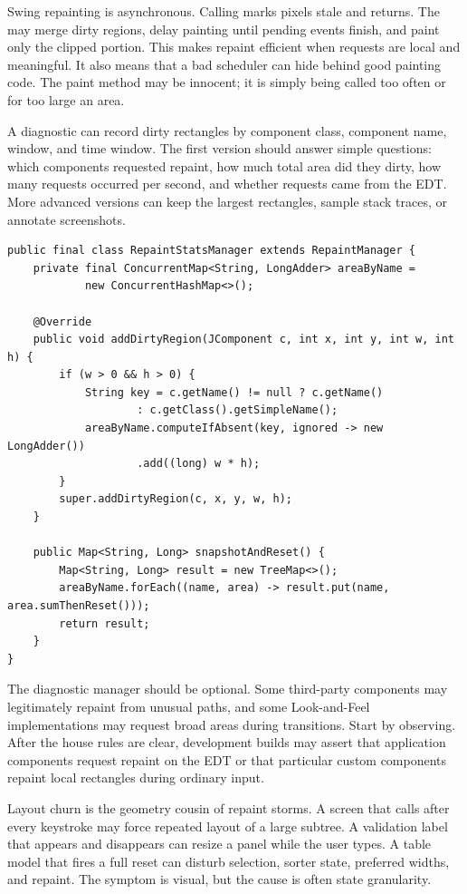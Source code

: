 Swing repainting is asynchronous. Calling  marks pixels stale and returns. The  may merge dirty regions, delay painting until pending events finish, and paint only the clipped portion. This makes repaint efficient when requests are local and meaningful. It also means that a bad scheduler can hide behind good painting code. The paint method may be innocent; it is simply being called too often or for too large an area.

A diagnostic  can record dirty rectangles by component class, component name, window, and time window. The first version should answer simple questions: which components requested repaint, how much total area did they dirty, how many requests occurred per second, and whether requests came from the EDT. More advanced versions can keep the largest rectangles, sample stack traces, or annotate screenshots.

\begin{lstlisting}[caption={Counting dirty repaint area by component name.}]
public final class RepaintStatsManager extends RepaintManager {
    private final ConcurrentMap<String, LongAdder> areaByName =
            new ConcurrentHashMap<>();

    @Override
    public void addDirtyRegion(JComponent c, int x, int y, int w, int h) {
        if (w > 0 && h > 0) {
            String key = c.getName() != null ? c.getName()
                    : c.getClass().getSimpleName();
            areaByName.computeIfAbsent(key, ignored -> new LongAdder())
                    .add((long) w * h);
        }
        super.addDirtyRegion(c, x, y, w, h);
    }

    public Map<String, Long> snapshotAndReset() {
        Map<String, Long> result = new TreeMap<>();
        areaByName.forEach((name, area) -> result.put(name, area.sumThenReset()));
        return result;
    }
}
\end{lstlisting}

The diagnostic manager should be optional. Some third-party components may legitimately repaint from unusual paths, and some Look-and-Feel implementations may request broad areas during transitions. Start by observing. After the house rules are clear, development builds may assert that application components request repaint on the EDT or that particular custom components repaint local rectangles during ordinary input.

Layout churn is the geometry cousin of repaint storms. A screen that calls  after every keystroke may force repeated layout of a large subtree. A validation label that appears and disappears can resize a panel while the user types. A table model that fires a full reset can disturb selection, sorter state, preferred widths, and repaint. The symptom is visual, but the cause is often state granularity.

